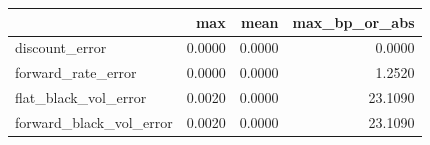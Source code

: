 \begin{tabular}{lrrr}
\toprule
 & max & mean & max\_bp\_or\_abs \\
\midrule
discount\_error & 0.0000 & 0.0000 & 0.0000 \\
forward\_rate\_error & 0.0000 & 0.0000 & 1.2520 \\
flat\_black\_vol\_error & 0.0020 & 0.0000 & 23.1090 \\
forward\_black\_vol\_error & 0.0020 & 0.0000 & 23.1090 \\
\bottomrule
\end{tabular}
